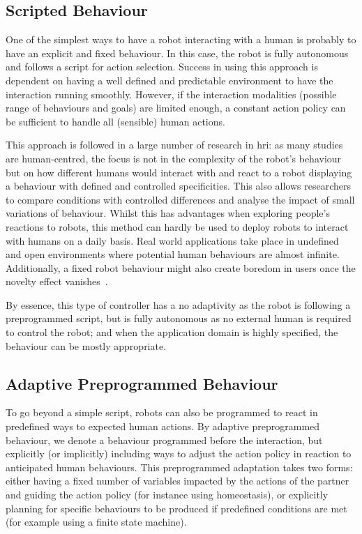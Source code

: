 \subsection{Scripted Behaviour}

    One of the simplest ways to have a robot interacting with a human is probably to have an explicit and fixed behaviour. In this case, the robot is fully autonomous and follows a script for action selection. Success in using this approach is dependent on having a well defined and predictable environment to have the interaction running smoothly. However, if the interaction modalities (possible range of behaviours and goals) are limited enough, a constant action policy can be sufficient to handle all (sensible) human actions. 
    
    This approach is followed in a large number of research in \gls{hri}: as many studies are human-centred, the focus is not in the complexity of the robot's behaviour but on how different humans would interact with and react to a robot displaying a behaviour with defined and controlled specificities. This also allows researchers to compare conditions with controlled differences and analyse the impact of small variations of behaviour. Whilst this has advantages when exploring people's reactions to robots, this method can hardly be used to deploy robots to interact with humans on a daily basis. Real world applications take place in undefined and open environments where potential human behaviours are almost infinite. Additionally, a fixed robot behaviour might also create boredom in users once the novelty effect vanishes~\citep{salter2004robots}.
  
    By essence, this type of controller has a no adaptivity as the robot is following a preprogrammed script, but is fully autonomous as no external human is required to control the robot; and when the application domain is highly specified, the behaviour can be mostly appropriate.

\subsection{Adaptive Preprogrammed Behaviour}
	
	To go beyond a simple script, robots can also be programmed to react in predefined ways to expected human actions. By adaptive preprogrammed behaviour, we denote a behaviour programmed before the interaction, but explicitly (or implicitly) including ways to adjust the action policy in reaction to anticipated human behaviours. This preprogrammed adaptation takes two forms: either having a fixed number of variables impacted by the actions of the partner and guiding the action policy (for instance using homeostasis), or explicitly planning for specific behaviours to be produced if predefined conditions are met (for example using a finite state machine).
	
